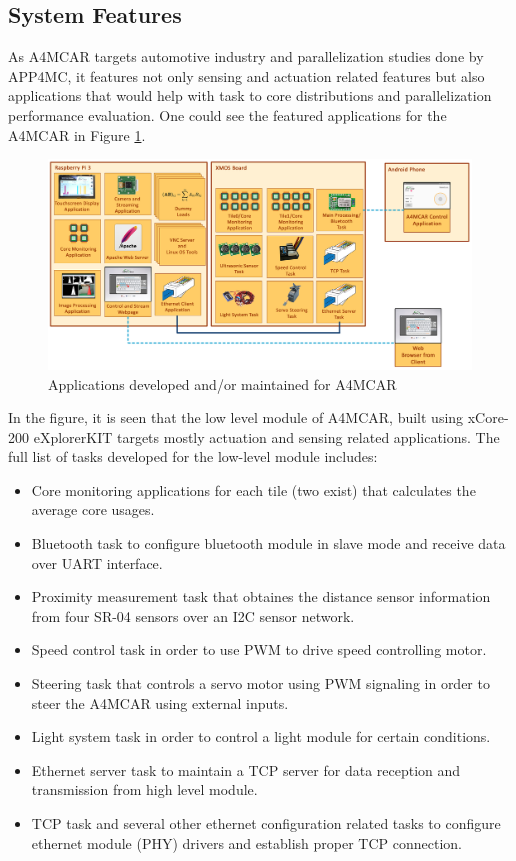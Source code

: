 \subsection{System Features}
As A4MCAR targets automotive industry and parallelization studies done by APP4MC, it features not only sensing and actuation related features but also applications that would help with task to core distributions and parallelization performance evaluation. One could see the featured applications for the A4MCAR in Figure \ref{fig:tasksoverall}. 
\begin{figure}[!ht]
	\centering
	\captionsetup{justification=centering}
	\includegraphics[scale=0.3]{content/images/tasksoverall.png}
	\caption{Applications developed and/or maintained for A4MCAR}
	\label{fig:tasksoverall}
\end{figure}
In the figure, it is seen that the low level module of A4MCAR, built using xCore-200 eXplorerKIT targets mostly actuation and sensing related applications. The full list of tasks developed for the low-level module includes:
\begin{itemize}
	\item Core monitoring applications for each tile (two exist) that calculates the average core usages.
	\item Bluetooth task to configure bluetooth module in slave mode and receive data over UART interface.
	\item Proximity measurement task that obtaines the distance sensor information from four SR-04 sensors over an I2C sensor network.
	\item Speed control task in order to use PWM to drive speed controlling motor.
	\item Steering task that controls a servo motor using PWM signaling in order to steer the A4MCAR using external inputs.
	\item Light system task in order to control a light module for certain conditions.
	\item Ethernet server task to maintain a TCP server for data reception and transmission from high level module.
	\item TCP task and several other ethernet configuration related tasks to configure ethernet module (PHY) drivers and establish proper TCP connection.
\end{itemize}
